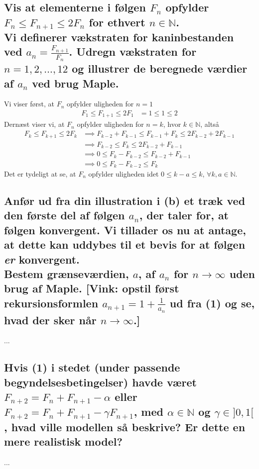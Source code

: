 \documentclass[11pt,a4paper]{article}
\begin{document}
\subsection
{
    \mdseries
    Vis at elementerne i følgen ${F_n}$ opfylder $F_n \leq F_{n+1} \leq 2F_n$
    for ethvert $n \in \mathbb{N}$.
    \\\indent
    Vi definerer vækstraten for kaninbestanden ved $a_n =
    \frac{F_{n+1}}{F_n}$. Udregn vækstraten for $n = 1, 2, \dots, 12$ og
    illustrer de beregnede værdier af $a_n$ ved brug Maple.
}
Vi viser først, at $F_n$ opfylder uligheden for $n=1$
\begin{align}
    F_1 \leq F_{1+1} \leq 2F_1 &= 1 \leq 1 \leq 2
\end{align}
Dernæst viser vi, at $F_n$ opfylder uligheden for $n=k$, hvor $k \in
\mathbb{N}$, altså
\begin{align}
    F_k \leq F_{k+1} \leq 2F_k
    &\implies
    F_{k-2} + F_{k-1} \leq F_{k-1} + F_{k} \leq 2F_{k-2} + 2F_{k-1} \\
    &\implies
    F_{k-2} \leq F_{k} \leq 2F_{k-2} + F_{k-1} \\
    &\implies
    0 \leq F_{k} - F_{k-2} \leq F_{k-2} + F_{k-1} \\
    &\implies
    0 \leq F_{k} - F_{k-2} \leq F_{k}
\end{align}
Det er tydeligt at se, at $F_n$ opfylder uligheden idet $0 \leq k - a \leq k$,
$\forall k, a \in \mathbb{N}$.

\subsection
{
    \mdseries
    Anfør ud fra din illustration i (b) et træk ved den første del af følgen
    ${a_n}$, der taler for, at følgen konvergent. Vi tillader os nu at
    antage, at dette kan uddybes til et bevis for at følgen {\it er}
    konvergent.
    \\\indent
    Bestem grænseværdien, $a$, af $a_n$ for $n \rightarrow \infty$ uden brug
    af Maple. [Vink: opstil først rekursionsformlen $a_{n+1} = 1 +
    \frac{1}{a_n}$ ud fra (1) og se, hvad der sker når $n \rightarrow
    \infty$.]
}
...

\subsection
{
    \mdseries
    Hvis (1) i stedet (under passende begyndelsesbetingelser) havde været
    $F_{n+2} = F_n + F_{n+1} - \alpha$ eller $F_{n+2} = F_n + F_{n+1} -
    \gamma F_{n+1}$, med $\alpha \in \mathbb{N}$ og $\gamma \in ]0,1[$,
    hvad ville modellen så beskrive? Er dette en mere realistisk model?
}
...
\end{document}
